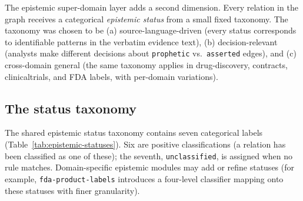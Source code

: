 The epistemic super-domain layer adds a second dimension. Every relation in the graph receives a categorical \emph{epistemic status} from a small fixed taxonomy. The taxonomy was chosen to be (a) source-language-driven (every status corresponds to identifiable patterns in the verbatim evidence text), (b) decision-relevant (analysts make different decisions about \texttt{prophetic} vs.\ \texttt{asserted} edges), and (c) cross-domain general (the same taxonomy applies in drug-discovery, contracts, clinicaltrials, and FDA labels, with per-domain variations).

\subsection{The status taxonomy}

The shared epistemic status taxonomy contains seven categorical labels (Table~\ref{tab:epistemic-statuses}). Six are positive classifications (a relation has been classified as one of these); the seventh, \texttt{unclassified}, is assigned when no rule matches. Domain-specific epistemic modules may add or refine statuses (for example, \texttt{fda-product-labels} introduces a four-level classifier mapping onto these statuses with finer granularity).

